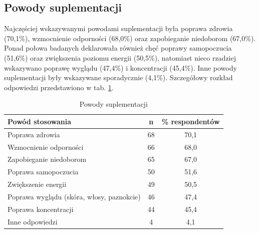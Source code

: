 % 




\subsection{Powody suplementacji}

Najczęściej wskazywanymi powodami suplementacji była poprawa zdrowia (70,1\%), wzmocnienie odporności (68,0\%) oraz zapobieganie niedoborom (67,0\%). Ponad połowa badanych deklarowała również chęć poprawy samopoczucia (51,6\%) oraz zwiększenia poziomu energii (50,5\%), natomiast nieco rzadziej wskazywano poprawę wyglądu (47,4\%) i koncentracji (45,4\%). Inne powody suplementacji były wskazywane sporadycznie (4,1\%). Szczegółowy rozkład odpowiedzi przedstawiono w tab. \ref{tab:powody-supl}.


\begin{table}[H]
    \centering
    \caption{Powody suplementacji}
    \label{tab:powody-supl}
    \begin{tabular}{|l|c|c|}
        \hline
        \textbf{Powód stosowania} & \textbf{n} & \textbf{\% respondentów} \\
        \hline
        \hline
        Poprawa zdrowia & 68 & 70,1 \\
        \hline
        Wzmocnienie odporności & 66 & 68,0 \\
        \hline
        Zapobieganie niedoborom & 65 & 67,0 \\
        \hline
        Poprawa samopoczucia & 50 & 51,6 \\
        \hline
        Zwiększenie energii & 49 & 50,5 \\
        \hline
        Poprawa wyglądu (skóra, włosy, paznokcie) & 46 & 47,4 \\
        \hline
        Poprawa koncentracji & 44 & 45,4 \\
        \hline
        Inne odpowiedzi & 4  & 4,1 \\
        \hline
    \end{tabular}
\end{table}


